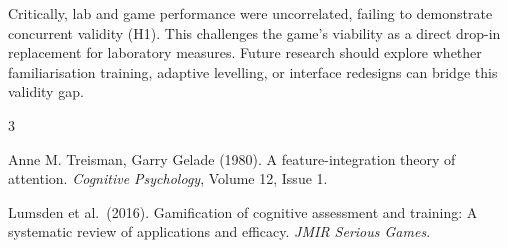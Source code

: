\documentclass[12pt]{article}
\begin{document}
Critically, lab and game performance were uncorrelated, failing to demonstrate
concurrent validity (H1). This challenges the game's viability as a direct
drop-in replacement for laboratory measures. Future research should explore
whether familiarisation training, adaptive levelling, or interface redesigns
can bridge this validity gap.



\begin{thebibliography}{3}

Anne M. Treisman, Garry Gelade (1980).
A feature-integration theory of attention.
\textit{Cognitive Psychology}, Volume 12, Issue 1.

Lumsden et al.\ (2016).
Gamification of cognitive assessment and training: A systematic review of applications and efficacy.
\textit{JMIR Serious Games}.

\end{thebibliography}
\end{document}
